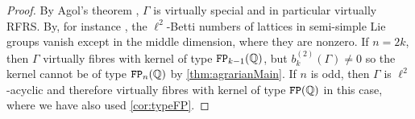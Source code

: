 \documentclass[11pt, letterpaper]{amsart}
\begin{document}
\begin{proof}
    By Agol's theorem \cite[Theorem 1.1]{AgolHaken}, $\Gamma$ is virtually special and in particular virtually RFRS. By, for instance \cite[Theorem 3.3]{KammeyerLattices}, the $\ell^2$-Betti numbers of lattices in semi-simple Lie groups vanish except in the middle dimension, where they are nonzero. If $n = 2k$, then $\Gamma$ virtually fibres with kernel of type $\mathtt{FP}_{k-1}(\mathbb{Q})$, but $b_k^{(2)}(\Gamma) \neq 0$ so the kernel cannot be of type $\mathtt{FP}_n(\mathbb{Q})$ by \cref{thm:agrarianMain}. If $n$ is odd, then $\Gamma$ is $\ell^2$-acyclic and therefore virtually fibres with kernel of type $\mathtt{FP}(\mathbb{Q})$ in this case, where we have also used \cref{cor:typeFP}. \qedhere
\end{proof}



\end{document}

